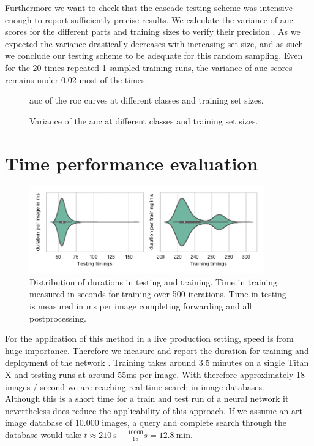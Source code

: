 Furthermore we want to check that the cascade testing scheme was intensive enough to report sufficiently precise results. We calculate the variance of \gls{auc} scores for the different parts and training sizes to verify their precision . As we expected the variance drastically decreases with increasing set size, and as such we conclude our testing scheme to be adequate for this random sampling. Even for the 20 times repeated 1 sampled training runs, the variance of \gls{auc} scores remains under 0.02 most of the times.
\begin{figure}[p!h]
    \centering
    
	\caption{\gls{auc} of the \gls{roc} curves at different classes and training set sizes.}
    \label{fig:auc_heatmap}
\end{figure}
\begin{figure}[p!h]
    \centering
    
	\caption{Variance of the \gls{auc} at different classes and training set sizes.}
    \label{fig:auc_var_heatmap}
\end{figure}

\section{Time performance evaluation}
\label{sec:results:time}
\begin{figure}[h!]
  \centering
  \includegraphics[width=0.9\textwidth]{figures/timings_fig}
  \caption{Distribution of durations in testing and training. Time in training measured in seconds for training over 500 iterations. Time in testing is measured in ms per image completing forwarding and all postprocessing.}
  \label{fig:timings}
\end{figure}
For the application of this method in a live production setting, speed is from huge importance. Therefore we measure and report the duration for training and deployment of the network . Training takes around 3.5 minutes on a single Titan X and testing runs at around 55ms per image. With therefore approximately 18 images / second we are reaching real-time search in image databases.\\
Although this is a short time for a train and test run of a neural network it  nevertheless does reduce the applicability of this approach. If we assume an art image database of 10.000 images, a query and complete search through the database would take $t \approx \SI{210}{\second} + \frac{10000}{18}s = \SI{12.8}{\minute}$.

